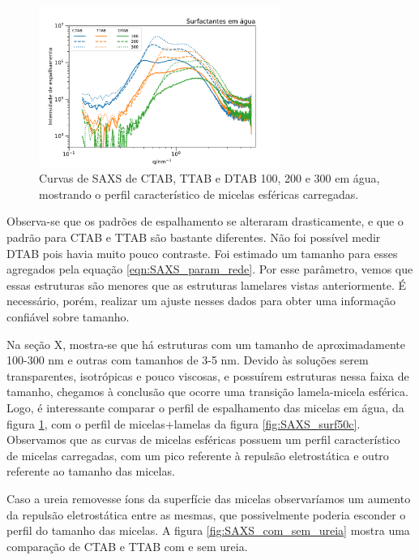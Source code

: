 	\begin{figure}[H]
		\centering
		\includegraphics[width=0.7\textwidth]{imagens/saxs/micelas_esfericas}
		\caption{Curvas de SAXS de CTAB, TTAB e DTAB 100, 200 e 300 \mM{} em água, mostrando o perfil característico de micelas esféricas carregadas.}
		\label{fig:SAXS_micelas_esfericas}
	\end{figure}  %

	Observa-se que os padrões de espalhamento se alteraram drasticamente, e que o padrão para CTAB e TTAB são bastante diferentes. Não foi possível medir DTAB pois havia muito pouco contraste. Foi estimado um tamanho para esses agregados pela equação \ref{eqn:SAXS_param_rede}. Por esse parâmetro, vemos que essas estruturas são menores que as estruturas lamelares vistas anteriormente. É necessário, porém, realizar um ajuste nesses dados para obter uma informação confiável sobre tamanho.
	
	Na seção X, mostra-se que há estruturas com um tamanho de aproximadamente 100-300 nm e outras com tamanhos de 3-5 nm. Devido às soluções serem transparentes, isotrópicas e pouco viscosas, e possuírem estruturas nessa faixa de tamanho, chegamos à conclusão que ocorre uma transição lamela-micela esférica. Logo, é interessante comparar o perfil de espalhamento das micelas em água, da figura \ref{fig:SAXS_micelas_esfericas}, com o perfil de micelas+lamelas da figura \ref{fig:SAXS_surf50c}. Observamos que as curvas de micelas esféricas possuem um perfil característico de micelas carregadas, com um pico referente à repulsão eletrostática e outro referente ao tamanho das micelas.
	
	Caso a ureia removesse íons da superfície das micelas observaríamos um aumento da repulsão eletrostática entre as mesmas, que possivelmente poderia esconder o perfil do tamanho das micelas. A figura \ref{fig:SAXS_com_sem_ureia} mostra uma comparação de CTAB e TTAB com e sem ureia.
	
